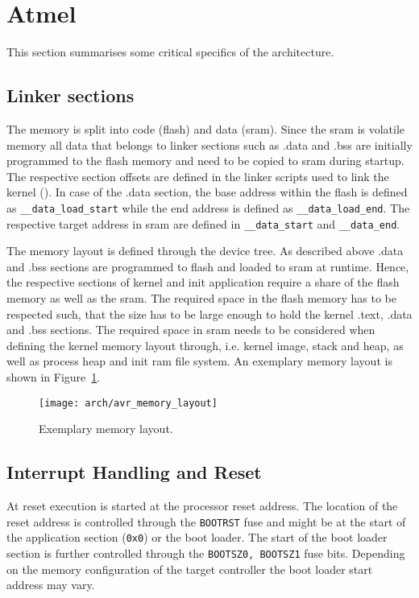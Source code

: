 %
%
%



\section{Atmel \avr}
	This section summarises some critical specifics of the \avr architecture.

	\subsection{Linker sections}
		The \avr memory is split into code (flash) and data (\gls{sram}). Since the \gls{sram} is volatile memory all data that belongs to linker sections such as .data and .bss are initially programmed to the flash memory and need to be copied to \gls{sram} during startup. The respective section offsets are defined in the linker scripts used to link the kernel (). In case of the .data section, the base address within the flash is defined as \lstinline{__data_load_start} while the end address is defined as \lstinline{__data_load_end}. The respective target address in \gls{sram} are defined in \lstinline{__data_start} and \lstinline{__data_end}.

		The memory layout is defined through the device tree. As described above .data and .bss sections are programmed to flash and loaded to \gls{sram} at runtime. Hence, the respective sections of kernel and init application require a share of the flash memory as well as the \gls{sram}. The required space in the flash memory has to be respected such, that the size has to be large enough to hold the kernel .text, .data and .bss sections. The required space in \gls{sram} needs to be considered when defining the kernel memory layout through, i.e. kernel image, stack and heap, as well as process heap and init ram file system. An exemplary memory layout is shown in Figure~\ref{fig:avr_memory_layout}.
		\begin{figure}[h]
			\centering	
			\texttt{[image: arch/avr\_memory\_layout]}
			\caption{Exemplary \avr memory layout.}
			\label{fig:avr_memory_layout}
		\end{figure}

	\subsection{Interrupt Handling and Reset}
		At reset execution is started at the processor reset address. The location of the reset address is controlled through the \lstinline{BOOTRST} fuse and might be at the start of the application section (\lstinline{0x0}) or the boot loader. The start of the boot loader section is further controlled through the \lstinline{BOOTSZ0, BOOTSZ1} fuse bits. Depending on the memory configuration of the target controller the boot loader start address may vary.
		
